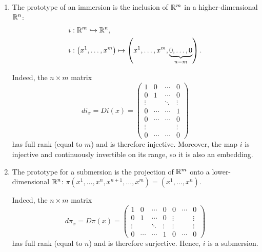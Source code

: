 \begin{example}
  \begin{enumerate}
    \item The prototype of an immersion is the inclusion of $\mathbb{R}^m$ in a higher-dimensional $\mathbb{R}^n$:
          \begin{align}
            i & : \R^m \hookrightarrow \R^n,                                                                                 \\
            i & : \left(x^1, \ldots, x^m\right) \mapsto \left(x^1, \ldots, x^m, \LaTeXunderbrace{0, \ldots, 0}_{n-m}\right).
          \end{align}

          Indeed, the $n\times m$ matrix
          \begin{equation}
            di_x = Di(x)
            = \begin{pmatrix}
              1      & 0      & \cdots & 0      \\
              0      & 1      & \cdots & 0      \\
              \vdots &        & \ddots & \vdots \\
              0      & \cdots & \cdots & 1      \\
              0      & \cdots & \cdots & 0      \\
              \vdots &        &        & \vdots \\
              0      & \cdots & \cdots & 0
            \end{pmatrix}
          \end{equation}
          has full rank (equal to $m$) and is therefore injective.
          Moreover, the map $i$ is injective and continuously invertible on its range, so it is also an embedding.

    \item The prototype for a submersion is the projection of $\mathbb{R}^m$ onto a lower-dimensional $\mathbb{R}^n$: $\pi\left(x^1,\ldots,x^n,x^{n+1},\ldots,x^m\right) = \left(x^1,\ldots,x^n\right)$.

          Indeed, the $n\times m$ matrix
          \begin{equation}
            d\pi_x = D\pi(x)
            = \begin{pmatrix}
              1      & 0      & \cdots & 0      & 0      & \cdots & 0      \\
              0      & 1      & \cdots & 0      & \vdots &        & \vdots \\
              \vdots &        & \ddots & \vdots & \vdots &        & \vdots \\
              0      & \cdots & \cdots & 1      & 0      & \cdots & 0
            \end{pmatrix}
          \end{equation}
          has full rank (equal to $n$) and is therefore surjective.
          Hence, $i$ is a submersion.


\end{enumerate}
\end{example}
